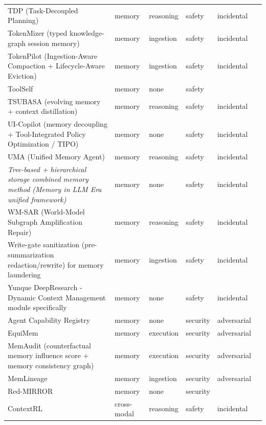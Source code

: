\begin{longtable}{@{}p{}lllll@{}}
TDP (Task-Decoupled Planning) & memory & reasoning & safety & incidental & \cite{li-2026-entangled} \\
TokenMizer (typed knowledge-graph session memory) & memory & ingestion & safety & incidental & \cite{mishra-2026-tokenmizer} \\
TokenPilot (Ingestion-Aware Compaction + Lifecycle-Aware Eviction) & memory & ingestion & safety & incidental & \cite{xu-2026-tokenpilot} \\
ToolSelf & memory & none & safety &  & \cite{zhou-2026-toolself} \\
TSUBASA (evolving memory + context distillation) & memory & reasoning & safety & incidental & \cite{zhang-2026-tsubasa} \\
UI-Copilot (memory decoupling + Tool-Integrated Policy Optimization / TIPO) & memory & none & safety & incidental & \cite{lu-2026-uicopilot} \\
UMA (Unified Memory Agent) & memory & reasoning & safety & incidental & \cite{zhang-2026-learning} \\
\emph{Tree-based + hierarchical storage combined memory method (Memory in LLM Era unified framework)} & memory & none & safety & incidental & \cite{wu-2026-memory} \\
WM-SAR (World-Model Subgraph Amplification Repair) & memory & reasoning & safety & incidental & \cite{song-2026-repair} \\
Write-gate sanitization (pre-summarization redaction/rewrite) for memory laundering & memory & ingestion & safety & incidental & \cite{wang-2026-state} \\
Yunque DeepResearch - Dynamic Context Management module specifically & memory & none & safety & incidental & \cite{cai-2026-yunque} \\
Agent Capability Registry & memory & none & security & adversarial & \cite{cai-2026-child} \\
EquiMem & memory & execution & security & adversarial & \cite{meng-2026-equimem} \\
MemAudit (counterfactual memory influence score + memory consistency graph) & memory & execution & security & adversarial & \cite{tan-2026-memaudit} \\
MemLineage & memory & ingestion & security & adversarial & \cite{ouyang-2026-memlineage} \\
Red-MIRROR & memory & none & security &  & \cite{khang-2026-redmirror} \\
ContextRL & cross-modal & reasoning & safety & incidental & \cite{xu-2026-contextaware} \\

\end{longtable}
